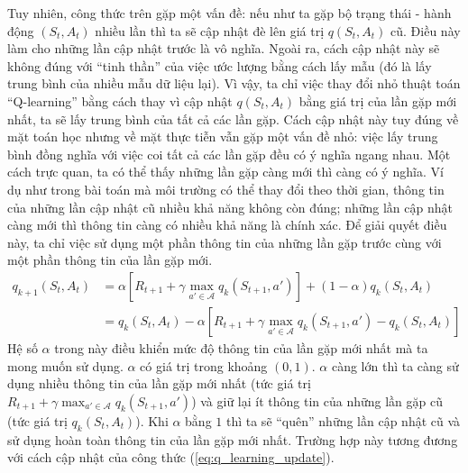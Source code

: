 Tuy nhiên, công thức trên gặp một vấn đề: nếu như ta gặp bộ trạng thái - hành động $(S_t,A_t)$ nhiều lần thì ta sẽ cập nhật đè lên giá trị $q(S_t,A_t)$ cũ.
Điều này làm cho những lần cập nhật trước là vô nghĩa.
Ngoài ra, cách cập nhật này sẽ không đúng với ``tinh thần'' của việc ước lượng bằng cách lấy mẫu (đó là lấy trung bình của nhiều mẫu dữ liệu lại).
Vì vậy, ta chỉ việc thay đổi nhỏ thuật toán ``Q-learning'' bằng cách thay vì cập nhật $q(S_t,A_t)$ bằng giá trị của lần gặp mới nhất, ta sẽ lấy trung bình của tất cả các lần gặp.
Cách cập nhật này tuy đúng về mặt toán học nhưng về mặt thực tiễn vẫn gặp một vấn đề nhỏ: việc lấy trung bình đồng nghĩa với việc coi tất cả các lần gặp đều có ý nghĩa ngang nhau.
Một cách trực quan, ta có thể thấy những lần gặp càng mới thì càng có ý nghĩa.
Ví dụ như trong bài toán mà môi trường có thể thay đổi theo thời gian, thông tin của những lần cập nhật cũ nhiều khả năng không còn đúng; những lần cập nhật càng mới thì thông tin càng có nhiều khả năng là chính xác.
Để giải quyết điều này, ta chỉ việc sử dụng một phần thông tin của những lần gặp trước cùng với một phần thông tin của lần gặp mới.
\begin{align}
	q_{k+1}(S_t, A_t) &= \alpha \left[ R_{t+1} + \gamma \max_{a' \in \mathcal{A}} q_{k}(S_{t+1}, a') \right] + (1 - \alpha) q_{k}(S_t, A_t) \nonumber \\
	&= q_{k}(S_t, A_t) - \alpha \left[ R_{t+1} + \gamma \max_{a' \in \mathcal{A}} q_{k}(S_{t+1}, a') - q_{k}(S_t, A_t) \right]
	\label{eq:q_learning_update_small}
\end{align}
Hệ số $\alpha$ trong này điều khiển mức độ thông tin của lần gặp mới nhất mà ta mong muốn sử dụng.
$\alpha$ có giá trị trong khoảng $(0,1)$.
$\alpha$ càng lớn thì ta càng sử dụng nhiều thông tin của lần gặp mới nhất (tức giá trị $R_{t+1} + \gamma \max_{a' \in \mathcal{A}} q_{k}(S_{t+1}, a')$) và giữ lại ít thông tin của những lần gặp cũ (tức giá trị $q_{k}(S_t, A_t)$).
Khi $\alpha$ bằng $1$ thì ta sẽ ``quên'' những lần cập nhật cũ và sử dụng hoàn toàn thông tin của lần gặp mới nhất.
Trường hợp này tương đương với cách cập nhật của công thức (\ref{eq:q_learning_update}).

